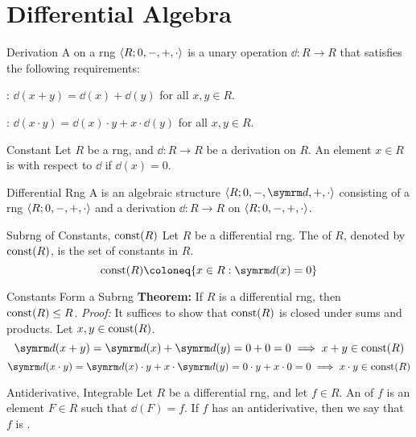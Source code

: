 \documentclass[12pt]{report}
\begin{document}
\chapter{Differential Algebra}

\begin{dfnbox}{Derivation}
	A  on a rng ${\langle {R; 0, -, +, \cdot} \rangle}$ is a unary operation $\dd: R \to R$ that satisfies the following requirements:
	\begin{dfnitems}
		\item {}: $\dd(x + y) = \dd(x) + \dd(y)$ for all $x, y \in R$.
		\item {}: $\dd(x \cdot y) = \dd(x) \cdot y + x \cdot \dd(y)$ for all $x, y \in R$.
	\end{dfnitems}
\end{dfnbox}

\begin{dfnbox}{Constant}
	Let $R$ be a rng, and $\dd: R \to R$ be a derivation on $R$. An element $x \in R$ is  with respect to $\dd$ if $\dd(x) = 0$.
\end{dfnbox}

\begin{dfnbox}{Differential Rng}
	A  is an algebraic structure $\alg{R; 0, -, \dd, +, \cdot}$ consisting of a rng ${\langle {R; 0, -, +, \cdot} \rangle}$ and a derivation $\dd: R \to R$ on ${\langle {R; 0, -, +, \cdot} \rangle}$.
\end{dfnbox}

\begin{dfnbox}{Subrng of Constants, $\operatorname{const}(R)$}
	Let $R$ be a differential rng. The  of $R$, denoted by $\operatorname{const}(R)$, is the set of constants in $R$.
	\[ \const(R) \coloneq \{ x \in R : \dd(x) = 0 \} \]
\end{dfnbox}

\begin{thmbox}{Constants Form a Subrng}
	\textbf{Theorem:} If $R$ is a differential rng, then $\operatorname{const}(R) \le R$.
\tcblower
	\textit{Proof:} It suffices to show that $\operatorname{const}(R)$ is closed under sums and products. Let $x, y \in \operatorname{const}(R)$.
	\[ \dd(x + y) = \dd(x) + \dd(y) = 0 + 0 = 0 \implies x + y \in \const(R) \]
	\[ \dd(x \cdot y) = \dd(x) \cdot y + x \cdot \dd(y) = 0 \cdot y + x \cdot 0 = 0 \implies x \cdot y \in \const(R) \]
\end{thmbox}

\begin{dfnbox}{Antiderivative, Integrable}
	Let $R$ be a differential rng, and let $f \in R$. An  of $f$ is an element $F \in R$ such that $\dd(F) = f$. If $f$ has an antiderivative, then we say that $f$ is .
\end{dfnbox}
\end{document}
